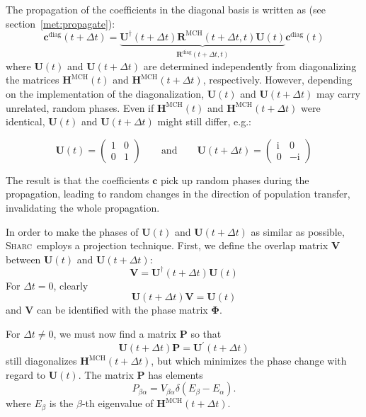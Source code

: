 \documentclass[a4paper,11pt,DIV=15,openany,twoside=false]{scrbook}
\newcommand{\ttmdump}[1]{#1}
\newcommand{\sharc}{\textsc{Sharc}}
\newcommand{\I}{\ensuremath{\mathrm{i}}}
\newcommand{\VEC}[1]{\ensuremath{\mathbf{#1}}}
\begin{document}
The propagation of the coefficients in the diagonal basis is written as (see section~\ref{met:propagate}):
\begin{equation}
  \VEC{c}^{\text{diag}}(t+\Delta t)=\underbrace{\VEC{U}^\dagger(t+\Delta t)\VEC{R}^{\text{MCH}}(t+\Delta t,t)\VEC{U}(t)}_{\VEC{R}^{\text{diag}}(t+\Delta t,t)}\VEC{c}^{\text{diag}}(t)
\end{equation}
where $\VEC{U}(t)$ and $\VEC{U}(t+\Delta t)$ are determined independently from diagonalizing the matrices $\VEC{H}^{\text{MCH}}(t)$ and $\VEC{H}^{\text{MCH}}(t+\Delta t)$, respectively. However, depending on the implementation of the diagonalization, $\VEC{U}(t)$ and $\VEC{U}(t+\Delta t)$ may carry unrelated, random phases. Even if $\VEC{H}^{\text{MCH}}(t)$ and $\VEC{H}^{\text{MCH}}(t+\Delta t)$ were identical, $\VEC{U}(t)$ and $\VEC{U}(t+\Delta t)$ might still differ, e.g.:
\ttmdump{
  \begin{equation}
    \VEC{U}(t)=
    \begin{pmatrix}1&0\\0&1\end{pmatrix}
    \qquad\text{and}\qquad 
    \VEC{U}(t+\Delta t)=
    \begin{pmatrix}\I&0\\0&-\I\end{pmatrix}
  \end{equation}
}
The result is that the coefficients $\VEC{c}$ pick up random phases during the propagation, leading to random changes in the direction of population transfer, invalidating the whole propagation.

In order to make the phases of $\VEC{U}(t)$ and $\VEC{U}(t+\Delta t)$ as similar as possible, \sharc\ employs a projection technique. First, we define the overlap matrix $\VEC{V}$ between $\VEC{U}(t)$ and $\VEC{U}(t+\Delta t)$:
\begin{equation}
  \VEC{V}=\VEC{U}^\dagger(t+\Delta t)\VEC{U}(t)
\end{equation}
For $\Delta t=0$, clearly
\begin{equation}
  \VEC{U}(t+\Delta t)\VEC{V}=\VEC{U}(t)
\end{equation}
and $\VEC{V}$ can be identified with the phase matrix $\boldsymbol{\Phi}$.

For $\Delta t\neq 0$, we must now find a matrix $\VEC{P}$ so that
\begin{equation}
  \VEC{U}(t+\Delta t)\VEC{P}=\VEC{U}^\prime(t+\Delta t)
\end{equation}
still diagonalizes $\VEC{H}^{\text{MCH}}(t+\Delta t)$, but which minimizes the phase change with regard to $\VEC{U}(t)$.
The matrix $\VEC{P}$ has elements
\begin{equation}
  P_{\beta\alpha}=V_{\beta\alpha}
  \delta\left(
    E_\beta-E_\alpha
  \right).
\end{equation}
where $E_\beta$ is the $\beta$-th eigenvalue of $\VEC{H}^{\text{MCH}}(t+\Delta t)$.
\end{document}
